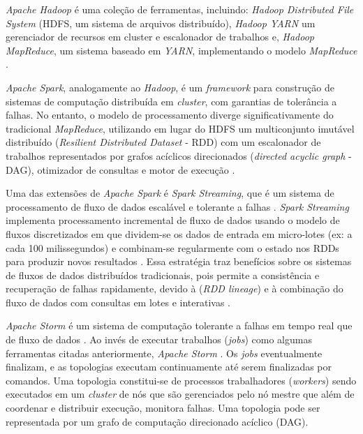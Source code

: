 \emph{Apache Hadoop} é uma coleção de ferramentas, incluindo: \emph{Hadoop
Distributed File System} (HDFS, um sistema de arquivos distribuído), \emph{Hadoop
YARN} um gerenciador de recursos em cluster e escalonador de trabalhos e,
\emph{Hadoop MapReduce}, um sistema baseado em \emph{YARN}, implementando o modelo
\emph{MapReduce} \cite{ApacheHadoop2020}.

\emph{Apache Spark}, analogamente ao \emph{Hadoop}, é um \emph{framework} para
construção de sistemas de computação distribuída em \emph{cluster}, com garantias
de tolerância a falhas.
No entanto, o modelo de processamento diverge
significativamente do tradicional \emph{MapReduce}, utilizando em lugar do HDFS
um multiconjunto imutável distribuído (\emph{Resilient Distributed Dataset}
- RDD) com um escalonador de trabalhos representados por grafos acíclicos
direcionados (\emph{directed acyclic graph} - DAG), otimizador de consultas e
motor de execução \cite{ApacheSpark2020}.

Uma das extensões de \emph{Apache Spark} é \emph{Spark Streaming}, que é um
sistema de processamento de fluxo de dados 
escalável e tolerante a falhas
\cite{zaharia2016,sparkStreaming2016}.
\emph{Spark Streaming} implementa processamento incremental de fluxo de
dados usando o modelo de fluxos discretizados em que dividem-se os dados de entrada
em micro-lotes (ex: a cada 100 milissegundos) e combinam-se regularmente com o
estado nos RDDs para produzir novos resultados \cite{zaharia2016}.
Essa estratégia traz benefícios sobre os sistemas de fluxos de dados distribuídos
tradicionais, pois permite a consistência e recuperação de falhas rapidamente,
devido à  (\emph{RDD lineage})
e à combinação do fluxo de dados com
consultas em lotes e interativas \cite{sparkStreaming2016,Lopez2018}.

\emph{Apache Storm} é um sistema de computação tolerante a falhas em tempo
real que  de fluxo de dados
\cite{ApacheStorm2020,Lopez2018}.
Ao invés de executar trabalhos (\emph{jobs}) como algumas ferramentas citadas
anteriormente, \emph{Apache Storm} .
Os \emph{jobs} eventualmente finalizam, e as topologias executam continuamente até
serem finalizadas por comandos.
Uma topologia constitui-se de processos trabalhadores (\emph{workers}) sendo executados
em um \emph{cluster} de nós que são gerenciados pelo nó mestre que além de
coordenar e distribuir execução, monitora falhas.
Uma topologia pode ser representada por um grafo de computação direcionado
acíclico (DAG).

